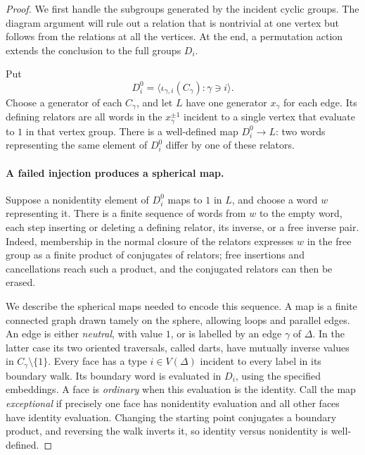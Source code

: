 \begin{proof}
We first handle the subgroups generated by the incident cyclic groups.
The diagram argument will rule out a relation that is nontrivial at one
vertex but follows from the relations at all the vertices.  At the end,
a permutation action extends the conclusion to the full groups $D_i$.

Put
\[
 D_i^0=\langle\iota_{\gamma,i}(C_\gamma):\gamma\ni i\rangle.
\]
Choose a generator of each $C_\gamma$, and let $L$ have one generator
$x_\gamma$ for each edge.  Its defining relators are all words in the
$x_\gamma^{\pm1}$ incident to a single vertex that evaluate to $1$ in
that vertex group.  There is a well-defined map $D_i^0\to L$: two words
representing the same element of $D_i^0$ differ by one of these relators.

\paragraph{A failed injection produces a spherical map.}
Suppose a nonidentity element of $D_i^0$ maps to $1$ in $L$, and choose a
word $w$ representing it.  There is a finite sequence of words from $w$
to the empty word, each step inserting or deleting a defining relator,
its inverse, or a free inverse pair.  Indeed, membership in the normal
closure of the relators expresses $w$ in the free group as a finite
product of conjugates of relators; free insertions and cancellations
reach such a product, and the conjugated relators can then be erased.

We describe the spherical maps needed to encode this sequence.  A map
is a finite connected graph drawn tamely on the sphere, allowing loops
and parallel edges.  An edge is either \emph{neutral}, with value $1$,
or is labelled by an edge $\gamma$ of $\Delta$.  In the latter case its
two oriented traversals, called darts, have mutually inverse values in
$C_\gamma\setminus\{1\}$.  Every face has a type $i\in V(\Delta)$
incident to every label in its boundary walk.  Its boundary word is
evaluated in $D_i$, using the specified embeddings. A face is
\emph{ordinary} when this evaluation is the identity. Call the map
\emph{exceptional} if precisely one face has nonidentity evaluation and
all other faces have identity evaluation.  Changing the starting point
conjugates a boundary product, and reversing the walk inverts it, so
identity versus nonidentity is well-defined.


\end{proof}
